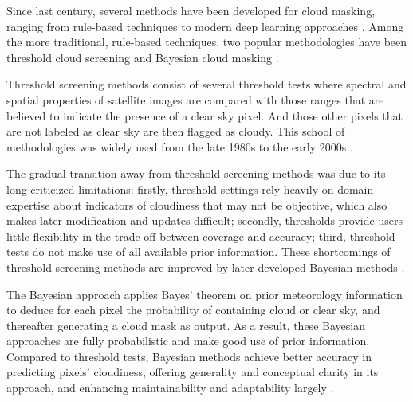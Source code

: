\documentclass[sigplan,screen]{acmart}
\begin{document}
Since last century, several methods have been developed for cloud masking, ranging from rule-based techniques \cite{Saunders1986AnAS,Saunders1988AnIM,Merchant2005ProbabilisticPB, Zhu2012ObjectbasedCA} to modern deep learning approaches \cite{Li2019DeepLB,Domnich2021KappaMaskAC,Yan2018CloudAC,WIELAND2019111203,JEPPESEN2019247}. Among the more traditional, rule-based techniques, two popular methodologies have been threshold cloud screening \cite{Saunders1986AnAS,Saunders1988AnIM} and Bayesian cloud masking \cite{Merchant2005ProbabilisticPB}. 

Threshold screening methods consist of several threshold tests where spectral and spatial properties of satellite images are compared with those ranges that are believed to indicate the presence of a clear sky pixel. And those other pixels that are not labeled as clear sky are then flagged as cloudy. This school of methodologies was widely used from the late 1980s to the early 2000s \cite{Merchant2005ProbabilisticPB}. 

The gradual transition away from threshold screening methods was due to its long-criticized limitations: firstly, threshold settings rely heavily on domain expertise about indicators of cloudiness that may not be objective, which also makes later modification and updates difficult; secondly, thresholds provide users little flexibility in the trade-off between coverage and accuracy; third, threshold tests do not make use of all available prior information. These shortcomings of threshold screening methods are improved by later developed Bayesian methods \cite{Merchant2005ProbabilisticPB}.

The Bayesian approach applies Bayes' theorem on prior meteorology information to deduce for each pixel the probability of containing cloud or clear sky, and thereafter generating a cloud mask as output. As a result, these Bayesian approaches are fully probabilistic and make good use of prior information. Compared to threshold tests, Bayesian methods achieve better accuracy in predicting pixels' cloudiness, offering generality and conceptual clarity in its approach, and enhancing maintainability and adaptability largely \cite{Merchant2005ProbabilisticPB}. 
\end{document}
